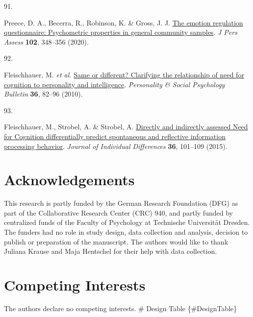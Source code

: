 \documentclass[
  man,floatsintext]{apa6}
\newlength{\cslhangindent}
\newlength{\csllabelwidth}
\newlength{\cslentryspacingunit} %
\newenvironment{CSLReferences}[2] %
 {%
  \setlength{\parindent}{0pt}
  \ifodd #1
  \let\oldpar\par
  \def\par{\hangindent=\cslhangindent\oldpar}
  \fi
  \setlength{\parskip}{#2\cslentryspacingunit}
 }%
 {}
\newcommand{\CSLLeftMargin}[1]{\parbox[t]{\csllabelwidth}{#1}}
\newcommand{\CSLRightInline}[1]{\parbox[t]{\linewidth - \csllabelwidth}{#1}\break}
\begin{document}
\begin{CSLReferences}{0}{0}
\leavevmode{}%
\CSLLeftMargin{91. }%
\CSLRightInline{Preece, D. A., Becerra, R., Robinson, K. \& Gross, J. J. \href{https://doi.org/10.1080/00223891.2018.1564319}{The emotion regulation questionnaire: Psychometric properties in general community samples}. \emph{J Pers Assess} \textbf{102}, 348--356 (2020).}

\leavevmode{}%
\CSLLeftMargin{92. }%
\CSLRightInline{Fleischhauer, M. \emph{et al.} \href{https://doi.org/10.1177/0146167209351886}{Same or different? {Clarifying} the relationship of need for cognition to personality and intelligence}. \emph{Personality \& Social Psychology Bulletin} \textbf{36}, 82--96 (2010).}

\leavevmode{}%
\CSLLeftMargin{93. }%
\CSLRightInline{Fleischhauer, M., Strobel, A. \& Strobel, A. \href{https://doi.org/10.1027/1614-0001/a000161}{Directly and indirectly assessed {N}eed for {C}ognition differentially predict spontaneous and reflective information processing behavior}. \emph{Journal of Individual Differences} \textbf{36}, 101--109 (2015).}

\end{CSLReferences}

\endgroup

\newpage

\hypertarget{acknowledgements}{%
\section{Acknowledgements}\label{acknowledgements}}

This research is partly funded by the German Research Foundation (DFG) as part of the Collaborative Research Center (CRC) 940, and partly funded by centralized funds of the Faculty of Psychology at Technische Universität Dresden.
The funders had no role in study design, data collection and analysis, decision to publish or preparation of the manuscript.
The authors would like to thank Juliana Krause and Maja Hentschel for their help with data collection.

\hypertarget{competing-interests}{%
\section{Competing Interests}\label{competing-interests}}

The authors declare no competing interests.
\# Design Table \{\#DesignTable\}
\end{document}
